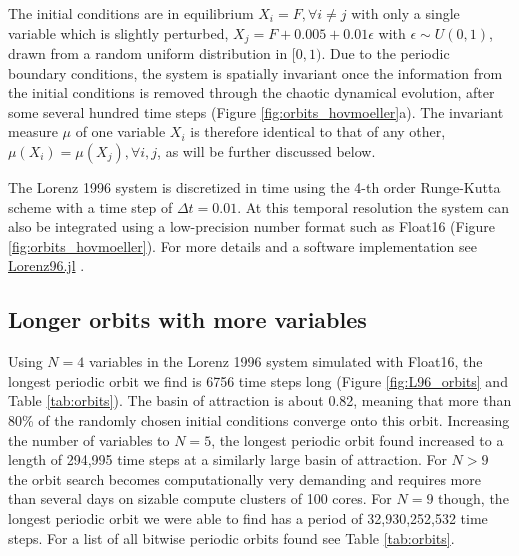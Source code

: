 The initial conditions are in equilibrium $X_i = F, \forall i \neq j$ with only a single variable which is slightly perturbed, 
$X_j = F + 0.005 + 0.01\epsilon$ with $\epsilon \sim U(0,1)$, drawn from a random uniform distribution in $[0,1)$.
Due to the periodic boundary conditions, the system is spatially invariant once the information from the initial conditions
is removed through the chaotic dynamical evolution, after some several hundred time steps (Figure \ref{fig:orbits_hovmoeller}a).
The invariant measure $\mu$ of one variable $X_i$ is therefore identical to that of any other, $\mu(X_i) = \mu(X_j), \forall i,j$,
as will be further discussed below.

The Lorenz 1996 system is discretized in time using the 4-th order Runge-Kutta scheme \citep{Butcher2008} with a time
step of $\Delta t = 0.01$. At this temporal resolution the system can also be integrated using a low-precision number format
such as Float16 (Figure \ref{fig:orbits_hovmoeller}). For more details and a software implementation see
\href{https://github.com/milankl/Lorenz96.jl}{Lorenz96.jl} \citep{Klower2021e}.

\subsection{Longer orbits with more variables}

Using $N=4$ variables in the Lorenz 1996 system simulated with Float16, the longest periodic orbit we find is 6756 time steps long
(Figure \ref{fig:L96_orbits} and Table \ref{tab:orbits}). The basin of attraction is about 0.82, meaning that more than 80\% of the randomly chosen initial
conditions converge onto this orbit. Increasing the number of variables to $N=5$, the longest periodic orbit found increased
to a length of 294,995 time steps at a similarly large basin of attraction. For $N>9$ the orbit search becomes computationally
very demanding and requires more than several days on sizable compute clusters of 100 cores. For $N=9$ though, the longest
periodic orbit we were able to find has a period of 32,930,252,532 time steps. For a list of all bitwise periodic orbits found see Table
\ref{tab:orbits}.

